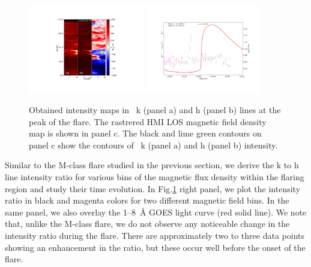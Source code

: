 \begin{figure}[ht!]
    \centering
    \includegraphics[trim={6cm 3cm 6cm 3cm},clip,width=0.45\textwidth]{Figures/contour_paper_plot_oct28.pdf}
    \includegraphics[trim={3cm 2cm 2cm 3cm},clip,width=0.45\textwidth]{Figures/Oct-22-2014-optical-dep-ev-2.pdf}
    \caption{Obtained intensity maps in  ~k (panel a) and h (panel b) lines at the peak of the flare. The rastrered HMI LOS magnetic field density map is shown in panel c. The black and lime green contours on panel c show the contours of  ~k (panel a) and h (panel b) intensity.}
\label{fig:align_raster_flare2}
\end{figure}

Similar to the M-class flare studied in the previous section, we derive the   k to h line intensity ratio for various bins of the magnetic flux density within the flaring region and study their time evolution. In Fig.\ref{fig:align_raster_flare2} right panel, we plot the intensity ratio in black and magenta colors for two different magnetic field bins. In the same panel, we also overlay the 1{--}8~{\AA} GOES light curve (red solid line). We note that, unlike the M-class flare, we do not observe any noticeable change in the intensity ratio during the flare. There are approximately two to three data points showing an enhancement in the ratio, but these occur well before the onset of the flare.

